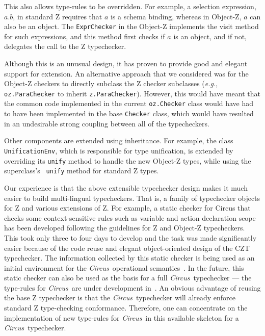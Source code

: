 \documentclass{llncs}
\newcommand{\Circus}{{\sf\slshape Circus}}
\begin{document}
This also allows type-rules to be overridden. For example, a
selection expression, $a.b$, in standard Z requires that $a$ is a
schema binding, whereas in Object-Z, $a$ can also be an object. The
{\tt ExprChecker} in the Object-Z implements the visit method for such
expressions, and this method first checks if $a$ is an object, and if
not, delegates the call to the Z typechecker.


Although this is an unusual design, it has proven to provide good
and elegant support for extension.  An alternative approach that we
considered was for the Object-Z checkers to directly subclass the Z
checker subclasses (\textit{e.g.}, \texttt{oz.ParaChecker} to inherit
\texttt{z.ParaChecker}).  However, this would have meant that the
common code implemented in the current
\texttt{oz.Checker} class would have had to have been
implemented in the base {\tt Checker} class, which would have resulted
in an undesirable strong coupling between all of the typecheckers.

Other components are extended using inheritance.  For example, the
class \texttt{UnificationEnv}, which is responsible for type
unification, is extended by overriding its {\tt unify} method to
handle the new Object-Z types, while using the superclass's {\tt
unify} method for standard Z types.

Our experience is that the above extensible typechecker design makes
it much easier to build multi-lingual typecheckers.  That is, a family
of typechecker objects for Z and various extensions of Z.
%
For example, a static checker for Circus that checks some
context-sensitive rules such as variable and action declaration scope
has been developed following the guidelines for Z and Object-Z
typecheckers. This took only three to four days to develop and the task was
made significantly easier because of the code reuse and elegant
object-oriented design of the CZT typechecker.  The information
collected by this static checker is being used as an initial
environment for the \Circus\ operational
semantics~\cite{circus.mc:opsem}.  In the future, this static checker
can also be used as the basis for a full \Circus\ typechecker --- the
type-rules for \Circus\ are under development in~\cite{circus.other:typechecker}.
An obvious advantage of reusing the base Z typechecker is that the \Circus\ typechecker
will already enforce standard Z type-checking conformance.  Therefore, one can
concentrate on the implementation of new type-rules for \Circus\ in
this available skeleton for a \Circus\ typechecker.
\end{document}
